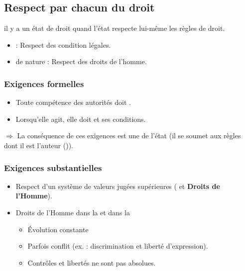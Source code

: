\subsection{Respect par chacun du droit}

il y a un état de droit quand l'état respecte lui-même les règles de droit.

\begin{itemize}
    \item {} : Respect des condition légales.
    \item {} de nature  : Respect des droits de l'homme.
\end{itemize}

\subsubsection{Exigences formelles}

\begin{itemize}
    \item Toute compétence des autorités doit .
    \item Lorsqu'elle agit, elle doit  et ses conditions.
\end{itemize}

$\Rightarrow$ La conséquence de ces exigences est une  de l'état (il se soumet aux règles dont il est l'auteur ()).

\subsubsection{Exigences substantielles}

\begin{itemize}
    \item Respect d'un système de valeurs jugées supérieures ( et \textbf{Droits de l'Homme}).
    \item Droits de l'Homme dans la  et dans la 
    \begin{itemize}
        \item Évolution constante
        \item Parfois conflit (ex. : discrimination et liberté d'expression).
        \item Contrôles et libertés ne sont pas absolues.
    \end{itemize}
\end{itemize}

